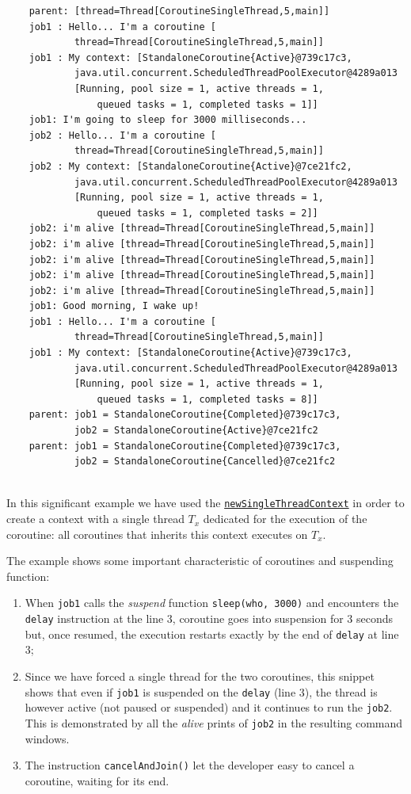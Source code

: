 \begin{Verbatim}
	parent: [thread=Thread[CoroutineSingleThread,5,main]]
	job1 : Hello... I'm a coroutine [
			thread=Thread[CoroutineSingleThread,5,main]]
	job1 : My context: [StandaloneCoroutine{Active}@739c17c3,
			java.util.concurrent.ScheduledThreadPoolExecutor@4289a013
			[Running, pool size = 1, active threads = 1,
				queued tasks = 1, completed tasks = 1]]
	job1: I'm going to sleep for 3000 milliseconds...
	job2 : Hello... I'm a coroutine [
			thread=Thread[CoroutineSingleThread,5,main]]
	job2 : My context: [StandaloneCoroutine{Active}@7ce21fc2,
			java.util.concurrent.ScheduledThreadPoolExecutor@4289a013
			[Running, pool size = 1, active threads = 1,
				queued tasks = 1, completed tasks = 2]]
	job2: i'm alive [thread=Thread[CoroutineSingleThread,5,main]]
	job2: i'm alive [thread=Thread[CoroutineSingleThread,5,main]]
	job2: i'm alive [thread=Thread[CoroutineSingleThread,5,main]]
	job2: i'm alive [thread=Thread[CoroutineSingleThread,5,main]]
	job2: i'm alive [thread=Thread[CoroutineSingleThread,5,main]]
	job1: Good morning, I wake up!
	job1 : Hello... I'm a coroutine [
			thread=Thread[CoroutineSingleThread,5,main]]
	job1 : My context: [StandaloneCoroutine{Active}@739c17c3,
			java.util.concurrent.ScheduledThreadPoolExecutor@4289a013
			[Running, pool size = 1, active threads = 1,
				queued tasks = 1, completed tasks = 8]]
	parent: job1 = StandaloneCoroutine{Completed}@739c17c3,
			job2 = StandaloneCoroutine{Active}@7ce21fc2
	parent: job1 = StandaloneCoroutine{Completed}@739c17c3,
			job2 = StandaloneCoroutine{Cancelled}@7ce21fc2
	
\end{Verbatim}

In this significant example we have used the \href{https://kotlinlang.org/api/kotlinx.coroutines/kotlinx-coroutines-core/kotlinx.coroutines/new-single-thread-context.html}{\texttt{newSingleThreadContext}} in order to create a context with a single thread $T_x$ dedicated for the execution of the coroutine: all coroutines that inherits this context executes on $T_x$.

The example shows some important characteristic of \Kotlin coroutines and suspending function:
\begin{enumerate}
	\item When \texttt{job1} calls the \textit{suspend} function \texttt{sleep(who, 3000)} and encounters the \texttt{delay} instruction at the line $3$, coroutine goes into suspension for $3$ seconds but, once resumed, the execution restarts exactly by the end of \texttt{delay} at line $3$;
	
	\item Since we have forced a single thread for the two coroutines, this snippet shows that even if \texttt{job1} is suspended on the \texttt{delay} (line $3$), the thread is however active (not paused or suspended) and it continues to run the \texttt{job2}. This is demonstrated by all the \textit{alive} prints of \texttt{job2} in the resulting command windows.
	
	\item The instruction \texttt{cancelAndJoin()} let the developer easy to cancel a coroutine, waiting for its end.
\end{enumerate}

